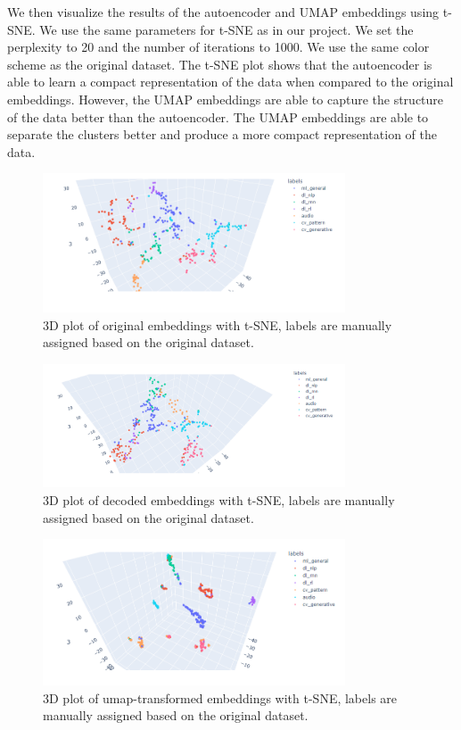 \documentclass{article}
\begin{document}
We then visualize the results of the autoencoder and UMAP embeddings using t-SNE. We use the same parameters for t-SNE as in our project. We set the perplexity to 20 and the number of iterations to 1000. We use the same color scheme as the original dataset. The t-SNE plot shows that the autoencoder is able to learn a compact representation of the data when compared to the original embeddings. However, the UMAP embeddings are able to capture the structure of the data better than the autoencoder. The UMAP embeddings are able to separate the clusters better and produce a more compact representation of the data.

\begin{figure}[h!]
\centering
\includegraphics[width=0.8\textwidth]{figs/tsne1.png}
\caption{3D plot of original embeddings with t-SNE, labels are manually assigned based on the original dataset.}
\end{figure}

\begin{figure}[h!]
\centering
\includegraphics[width=0.8\textwidth]{figs/tsne2.png}
\caption{3D plot of decoded embeddings with t-SNE, labels are manually assigned based on the original dataset.}
\end{figure}

\begin{figure}[h!]
\centering
\includegraphics[width=0.8\textwidth]{figs/tsne3.png}
\caption{3D plot of umap-transformed embeddings with t-SNE, labels are manually assigned based on the original dataset.}
\end{figure}
\end{document}
